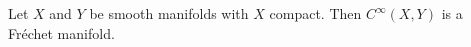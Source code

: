 Let $X$ and $Y$ be smooth manifolds with $X$ compact. Then $C^\infty(X, Y)$ is a Fr\'{e}chet manifold.
